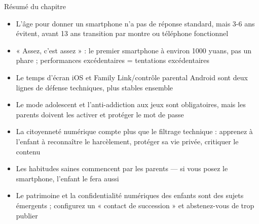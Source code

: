 \begin{tcbsummary}{Résumé du chapitre}
\begin{itemize}
  \item L'âge pour donner un smartphone n'a pas de réponse standard, mais 3-6 ans évitent, avant 13 ans transition par montre ou téléphone fonctionnel
  \item « Assez, c'est assez » : le premier smartphone à environ 1000 yuans, pas un phare ; performances excédentaires = tentations excédentaires
  \item Le temps d'écran iOS et Family Link/contrôle parental Android sont deux lignes de défense techniques, plus stables ensemble
  \item Le mode adolescent et l'anti-addiction aux jeux sont obligatoires, mais les parents doivent les activer et protéger le mot de passe
  \item La citoyenneté numérique compte plus que le filtrage technique : apprenez à l'enfant à reconnaître le harcèlement, protéger sa vie privée, critiquer le contenu
  \item Les habitudes saines commencent par les parents — si vous posez le smartphone, l'enfant le fera aussi
  \item Le patrimoine et la confidentialité numériques des enfants sont des sujets émergents ; configurez un « contact de succession » et abstenez-vous de trop publier
\end{itemize}

\end{tcbsummary}
